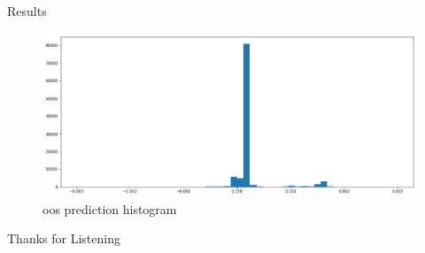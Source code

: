 \documentclass{beamer}
\begin{document}
\begin{frame}{Results}
    \begin{figure}[ht]
        \centering
        \includegraphics[width=0.7\linewidth,height=0.7\linewidth]{agg_5.png}
        \caption{oos prediction histogram}
        \label{fig:label}
    \end{figure}
\end{frame}


\begin{frame}
\Huge{\centerline{Thanks for Listening}}
\end{frame}
\end{document}
